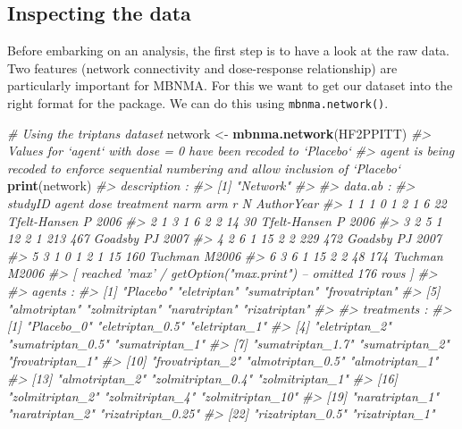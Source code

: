 \documentclass[]{article}
\newenvironment{Shaded}{\begin{snugshade}}{\end{snugshade}}
\newcommand{\CommentTok}[1]{\textcolor[rgb]{0.56,0.35,0.01}{\textit{#1}}}
\newcommand{\KeywordTok}[1]{\textcolor[rgb]{0.13,0.29,0.53}{\textbf{#1}}}
\newcommand{\NormalTok}[1]{#1}
\newcommand{\StringTok}[1]{\textcolor[rgb]{0.31,0.60,0.02}{#1}}
\begin{document}
\hypertarget{inspecting-the-data}{%
\subsection{Inspecting the data}\label{inspecting-the-data}}

Before embarking on an analysis, the first step is to have a look at the
raw data. Two features (network connectivity and dose-response
relationship) are particularly important for MBNMA. For this we want to
get our dataset into the right format for the package. We can do this
using \texttt{mbnma.network()}.

\begin{Shaded}
\begin{Highlighting}[]
\CommentTok{# Using the triptans dataset}
\NormalTok{network <-}\StringTok{ }\KeywordTok{mbnma.network}\NormalTok{(HF2PPITT)}
\CommentTok{#> Values for `agent` with dose = 0 have been recoded to `Placebo`}
\CommentTok{#> agent is being recoded to enforce sequential numbering and allow inclusion of `Placebo`}
\KeywordTok{print}\NormalTok{(network)}
\CommentTok{#> description :}
\CommentTok{#> [1] "Network"}
\CommentTok{#> }
\CommentTok{#> data.ab :}
\CommentTok{#>   studyID agent dose treatment narm arm   r   N          AuthorYear}
\CommentTok{#> 1       1     1    0         1    2   1   6  22 Tfelt-Hansen P 2006}
\CommentTok{#> 2       1     3    1         6    2   2  14  30 Tfelt-Hansen P 2006}
\CommentTok{#> 3       2     5    1        12    2   1 213 467     Goadsby PJ 2007}
\CommentTok{#> 4       2     6    1        15    2   2 229 472     Goadsby PJ 2007}
\CommentTok{#> 5       3     1    0         1    2   1  15 160       Tuchman M2006}
\CommentTok{#> 6       3     6    1        15    2   2  48 174       Tuchman M2006}
\CommentTok{#>  [ reached 'max' / getOption("max.print") -- omitted 176 rows ]}
\CommentTok{#> }
\CommentTok{#> agents :}
\CommentTok{#> [1] "Placebo"      "eletriptan"   "sumatriptan"  "frovatriptan"}
\CommentTok{#> [5] "almotriptan"  "zolmitriptan" "naratriptan"  "rizatriptan" }
\CommentTok{#> }
\CommentTok{#> treatments :}
\CommentTok{#>  [1] "Placebo_0"        "eletriptan_0.5"   "eletriptan_1"    }
\CommentTok{#>  [4] "eletriptan_2"     "sumatriptan_0.5"  "sumatriptan_1"   }
\CommentTok{#>  [7] "sumatriptan_1.7"  "sumatriptan_2"    "frovatriptan_1"  }
\CommentTok{#> [10] "frovatriptan_2"   "almotriptan_0.5"  "almotriptan_1"   }
\CommentTok{#> [13] "almotriptan_2"    "zolmitriptan_0.4" "zolmitriptan_1"  }
\CommentTok{#> [16] "zolmitriptan_2"   "zolmitriptan_4"   "zolmitriptan_10" }
\CommentTok{#> [19] "naratriptan_1"    "naratriptan_2"    "rizatriptan_0.25"}
\CommentTok{#> [22] "rizatriptan_0.5"  "rizatriptan_1"}
\end{Highlighting}
\end{Shaded}
\end{document}
